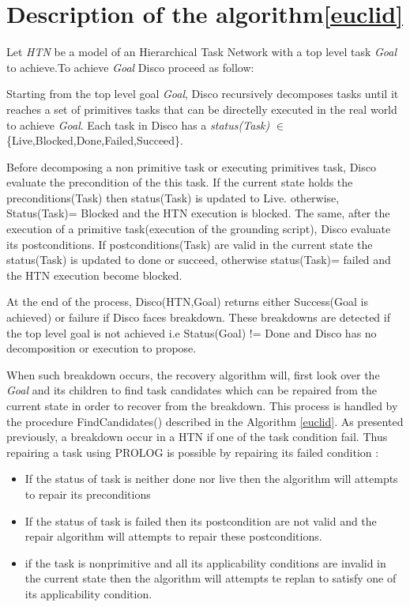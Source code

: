 \documentclass{article}
\begin{document}
\section{Description of the algorithm\ref{euclid}}
	
Let \textit{HTN} be a model of an Hierarchical Task Network with a top level task \textit{Goal} to achieve.To achieve \textit{Goal} Disco proceed as follow:


	Starting from the top level goal \textit{Goal}, Disco recursively decomposes tasks until it reaches a set of primitives tasks that can be directelly executed in the real world to achieve \textit{Goal}.
	Each task in Disco has a \textit{status(Task)} $\in$ \{Live,Blocked,Done,Failed,Succeed\}.
\par Before decomposing a non primitive task or executing primitives task, Disco evaluate the precondition of the this task. If the current state holds the preconditions(Task) then status(Task) is updated to Live. otherwise, Status(Task)= Blocked and the HTN execution is blocked.
	 The same, after the execution of a primitive task(execution of the grounding script), Disco evaluate its postconditions. If postconditions(Task) are valid in the current state the status(Task) is updated to done or succeed, otherwise status(Task)= failed and the HTN execution become blocked.
	 
	 
	 At the end of the process, Disco(HTN,Goal) returns either Success(Goal is achieved) or failure if Disco faces breakdown. These breakdowns are detected if the top level goal is not achieved i.e Status(Goal) != Done and Disco has no decomposition or execution to propose. 
	 
	 When such breakdown occurs, the recovery algorithm will, first look over the \textit{Goal} and its children to find task candidates which can be repaired from the current state in order to recover from the breakdown. This process is handled by the procedure FindCandidates() described in the Algorithm \ref{euclid}.
	 As presented previously, a breakdown occur in a HTN if one of the task condition fail. Thus repairing a task using PROLOG is possible by repairing its failed condition :
	 \begin{itemize}
	 \item	If the status of task is neither done nor live then the algorithm will attempts to repair its preconditions
	 \item	If the status of task is failed then its postcondition are not valid and the repair algorithm will attempts to repair these postconditions.
	 \item	if the task is nonprimitive and all its applicability conditions are invalid in the current state then the algorithm will attempts te replan to satisfy one of its applicability condition. 
	\end{itemize}
	
\end{document}
